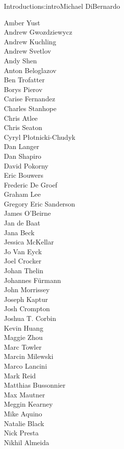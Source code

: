 \begin{aosachapter}{Introduction}{s:intro}{Michael DiBernardo}
\begin{multicols}{3}
\noindent Amber Yust \\
Andrew Gwozdziewycz \\
Andrew Kuchling \\
Andrew Svetlov \\
Andy Shen \\
Anton Beloglazov \\
Ben Trofatter \\
Borys Pierov \\
Carise Fernandez \\
Charles	Stanhope \\
Chris Atlee \\
Chris Seaton \\
Cyryl Płotnicki-Chudyk \\
Dan Langer \\
Dan Shapiro \\
David Pokorny \\
Eric Bouwers \\
Frederic De Groef \\
Graham Lee \\
Gregory Eric Sanderson \\
James O'Beirne \\
Jan de Baat \\
Jana Beck \\
Jessica McKellar \\
Jo Van Eyck \\
Joel Crocker \\
Johan Thelin \\
Johannes Fürmann \\
John Morrissey \\
Joseph Kaptur \\
Josh Crompton \\
Joshua T. Corbin \\
Kevin Huang \\
Maggie Zhou \\
Marc Towler \\
Marcin Milewski \\
Marco Lancini \\
Mark Reid \\
Matthias Bussonnier \\
Max Mautner \\
Meggin Kearney \\
Mike Aquino \\
Natalie	Black \\
Nick Presta \\
Nikhil Almeida \\

\end{multicols}
\end{aosachapter}

